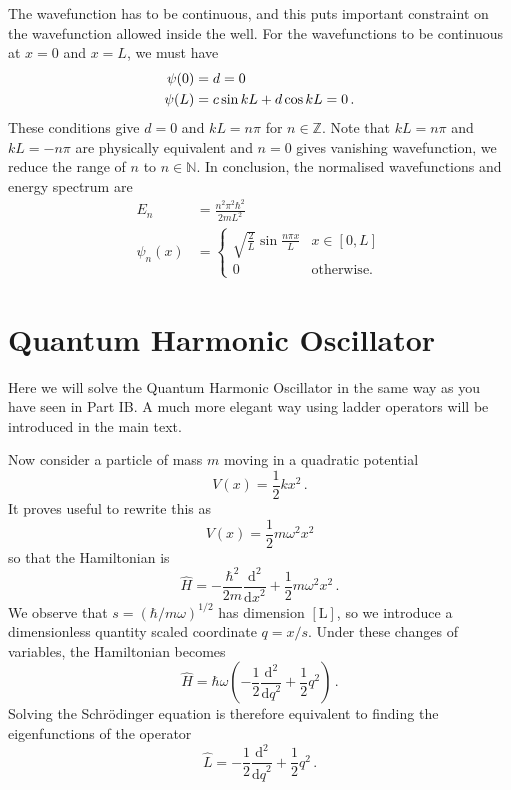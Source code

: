 \documentclass{article}
\theoremstyle{plain}\theoremheaderfont{\normalfont\itshape}\theorembodyfont{\rmfamily}\theoremseparator{.}\newtheorem*{rem}{Remark}\newtheorem*{ex}{Example}\newtheorem*{proof}{Proof}\newtheorem*{altp}{Alternative proof}
\theoremstyle{plain}\theoremheaderfont{\normalfont\bfseries}\theorembodyfont{\rmfamily}\theoremseparator{.}\newtheorem{thm}{Theorem}[section]\newtheorem{lem}[thm]{Lemma}\newtheorem{prop}[thm]{Proposition}\newtheorem*{cor}{Corollary}\newtheorem{defn}[thm]{Definition}\newtheorem{clm}[thm]{Claim}\newtheorem{clminproof}{Claim}
\theoremstyle{break}\theoremheaderfont{\normalfont\itshape}\theorembodyfont{\rmfamily}\theoremseparator{.\medskip}\newtheorem*{proofskip}{Proof}\newtheorem*{exs}{Examples}\newtheorem*{rems}{Remarks}
\theoremstyle{break}\theoremheaderfont{\normalfont\bfseries}\theorembodyfont{\rmfamily}\theoremseparator{.\medskip}\newtheorem{lemskip}[thm]{Lemma}\newtheorem{defnskip}[thm]{Definition}\newtheorem{propskip}[thm]{Proposition}\newtheorem{thmskip}[thm]{Theorem}
\numberwithin{equation}{section}
\newcommand{\dv}[3][]{\frac{\mathrm{d}^{#1} #2}{{\mathrm{d} #3}^{#1}}}
\begin{document}
    The wavefunction has to be continuous, and this puts important constraint on the wavefunction allowed inside the well. For the wavefunctions to be continuous at \(x=0\) and \(x=L\), we must have
    \begin{align}
        \psi(0)&=d=0\notag \\
        \psi(L)&=c\sin kL + d\cos kL=0\,.
    \end{align}
    These conditions give \(d=0\) and \(kL=n\pi\) for \(n\in\mathbb{Z}\). Note that \(kL=n\pi\) and \(kL=-n\pi\) are physically equivalent and \(n=0\) gives vanishing wavefunction, we reduce the range of \(n\) to \(n\in\mathbb{N}\). In conclusion, the normalised wavefunctions and energy spectrum are
    \begin{align}
        E_n&=\frac{n^2\pi^2\hbar^2}{2mL^2}\\
        \psi_n(x)&=\begin{cases}
            \sqrt{\frac{2}{L}}\sin\frac{n\pi x}{L} & x\in[0,L] \\
            0 & \text{otherwise.}
        \end{cases}
    \end{align}

    \newpage
    \section{Quantum Harmonic Oscillator}
    Here we will solve the Quantum Harmonic Oscillator in the same way as you have seen in Part IB. A much more elegant way using ladder operators will be introduced in the main text.

    Now consider a particle of mass \(m\) moving in a quadratic potential
    \begin{equation}
        V(x)=\frac{1}{2}kx^2\,.
    \end{equation}
    It proves useful to rewrite this as
    \begin{equation}
        V(x)=\frac{1}{2}m\omega^2 x^2
    \end{equation}
    so that the Hamiltonian is
    \begin{equation}
        \hat{H}=-\frac{\hbar^2}{2m}\dv[2]{}{x}+\frac{1}{2}m\omega^2 x^2\,.
    \end{equation}
    We observe that \(s=(\hbar/m\omega)^{1/2}\) has dimension \([\mathrm{L}]\), so we introduce a dimensionless quantity scaled coordinate \(q=x/s\). Under these changes of variables, the Hamiltonian becomes
    \begin{equation}
        \hat{H}=\hbar\omega\left(-\frac{1}{2}\dv[2]{}{q}+\frac{1}{2}q^2\right)\,.
    \end{equation}
    Solving the Schr\"{o}dinger equation is therefore equivalent to finding the eigenfunctions of the operator
    \begin{equation}
        \hat{L}=-\frac{1}{2}\dv[2]{}{q}+\frac{1}{2}q^2\,.
    \end{equation}
\end{document}
